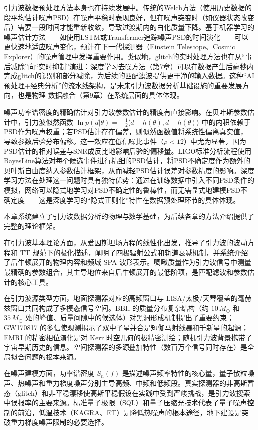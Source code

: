 引力波数据预处理方法本身也在持续发展中。传统的Welch方法（使用历史数据的段平均估计噪声PSD）在噪声平稳时表现良好，但在噪声突变时（如仪器状态改变后）需要一段时间才能重新收敛，导致过渡期内的白化质量下降。基于机器学习的噪声估计方法——如使用LSTM或Transformer追踪噪声PSD的时间演化——可以更快速地适应噪声变化，预计在下一代探测器（Einstein Telescope、Cosmic Explorer）的噪声管理中发挥重要作用。类似地，glitch的实时处理方法也在从“事后减除”向“实时抑制”演进：深度学习去噪方法（第7章）可以在数据产生后毫秒内完成glitch的识别和部分减除，为后续的匹配滤波提供更干净的输入数据。这种“AI预处理+经典分析”的流水线架构，是未来引力波数据分析基础设施的重要发展方向，也是物理-数据融合（第9章）在系统层面的具体体现。

噪声功率谱密度的精确估计对引力波参数估计的精度有直接影响。在贝叶斯参数估计中，引力波似然函数 $\ln p(d|\theta) = -\frac{1}{2}\langle d-h(\theta), d-h(\theta)\rangle$ 中的内积依赖于PSD作为噪声权重；若PSD估计存在偏差，则似然函数值将系统性偏离真实值，导致参数后验分布偏移。这一效应在低信噪比事件（$\rho < 12$）中尤为显著，因为PSD估计的相对误差与SNR成反比地影响后验的偏移量。LIGO标准分析流程使用BayesLine算法对每个候选事件进行精细的PSD估计，将PSD不确定度作为额外的贝叶斯自由度纳入参数估计框架，从而减轻PSD估计误差对参数精度的影响。深度学习方法在处理这一问题时具有独特优势：通过在训练数据中引入不同PSD条件的模拟，网络可以隐式地学习对PSD不确定性的鲁棒性，而无需显式地建模PSD不确定度——这是深度学习的“隐式正则化”特性在数据预处理环节的具体体现。

本章系统建立了引力波数据分析的物理与数学基础，为后续各章的方法介绍提供了完整的理论框架。

在引力波基本理论方面，从爱因斯坦场方程的线性化出发，推导了引力波的波动方程和 TT 规范下的极化描述，阐明了四极辐射公式和轨道衰减机制，并系统介绍了后牛顿展开的物理内容和频域 SPA 波形表示。啁啾质量作为引力波信号中测量最精确的参数组合，其主导地位来自后牛顿展开的最低阶项，是匹配滤波和参数估计的核心工具。

在引力波源类型方面，地面探测器对应的高频窗口与 LISA/太极/天琴覆盖的毫赫兹窗口共同构成了多模态信号空间。BBH 的质量分布复杂结构（约 $10\,M_\odot$ 和 $35\,M_\odot$ 处的峰值、质量间隙中的候选体）对黑洞形成机制提出了重要约束；GW170817 的多信使观测揭示了双中子星并合是短伽马射线暴和千新星的起源；EMRI 的精密相位演化是对 Kerr 时空几何的极精密测绘；随机引力波背景携带了宇宙早期历史的信息。空间探测器的多源叠加特性（数百万个信号同时存在）是全局拟合问题的根本来源。

在噪声建模方面，功率谱密度 $S_n(f)$ 是描述噪声频率特性的核心量，量子散粒噪声、热噪声和重力梯度噪声分别主导高频、中频和低频段。真实探测器的非高斯暂态（glitch）和非平稳漂移使高斯平稳假设在实践中受到严峻挑战，是引力波搜索中误报率的主要来源。标准量子极限（SQL）和量子压缩光技术代表了量子噪声控制的前沿，低温技术（KAGRA、ET）是降低热噪声的根本途径，地下建设是突破重力梯度噪声限制的必要选择。

